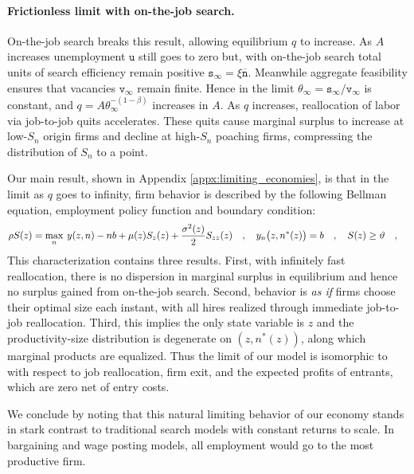 \paragraph{Frictionless limit with on-the-job search.}
On-the-job search breaks this result, allowing equilibrium $q$ to increase.
As $A$ increases unemployment $\mathtt{u}$ still goes to zero but, with on-the-job search total units of search efficiency remain positive $\mathtt{s}_\infty=\xi\overline{\mathtt{n}}$.
Meanwhile aggregate feasibility ensures that vacancies $\mathtt{v}_\infty$  remain finite.
Hence in the limit $\theta_\infty = \mathtt{s}_\infty/\mathtt{v}_\infty$ is constant, and $q=A\theta_\infty^{-(1-\beta)}$ increases in $A$.
As $q$ increases, reallocation of labor via job-to-job quits accelerates.
These quits cause marginal surplus to increase at low-$S_n$ origin firms and decline at high-$S_n$ poaching firms, compressing the distribution of $S_n$ to a point.

Our main result, shown in Appendix \ref{appx:limiting_economies}, is that in the limit as $q$ goes to infinity, firm behavior is described by the following Bellman equation, employment policy function and boundary condition:
\vspace*{-.3cm}\begin{equation}\label{eq:hopenhayn}
\rho {S}(z) = \max_n\: y(z,n) - nb + \mu(z) S_z(z)+ \frac{\sigma^2(z)}{2} S_{zz}(z)
\quad,\quad
y_n\big(z,n^\ast(z)\big) = b
\quad,\quad
\Big.{S}(z)  \geq  \vartheta
\quad,\quad
\vspace*{-.1cm}\end{equation}
This characterization contains three results.
First, with infinitely fast reallocation, there is no dispersion in marginal surplus in equilibrium and hence no surplus gained from on-the-job search.
Second, behavior is \emph{as if} firms choose their optimal size each instant, with all hires realized through immediate job-to-job reallocation.
Third, this implies the only state variable is $z$ and the productivity-size distribution is degenerate on $(z,n^*(z))$, along which marginal products are equalized.
Thus the limit of our model is isomorphic to \citet{HopenhaynEMET} with respect to job reallocation, firm exit, and the expected profits of entrants, which are zero net of entry costs.

We conclude by noting that this natural limiting behavior of our economy stands in stark contrast to traditional search models with constant returns to scale.
In bargaining and wage posting models, all employment would go to the most productive firm.

